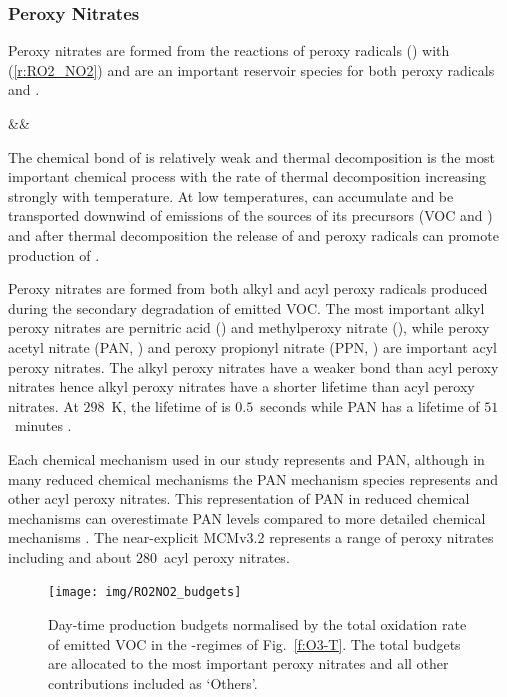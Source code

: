 \subsubsection{Peroxy Nitrates} \label{sss:ro2no2}
Peroxy nitrates are formed from the reactions of peroxy radicals () with  (\ref{r:RO2_NO2}) and are an important reservoir species for both peroxy radicals and .
\begin{rxnarray}
    &&  \rightleftharpoons {} \label{r:RO2_NO2}
\end{rxnarray}
The chemical bond of  is relatively weak and thermal decomposition is the most important chemical process with the rate of thermal decomposition increasing strongly with temperature.
At low temperatures,  can accumulate and be transported downwind of emissions of the sources of its precursors (VOC and ) and after thermal decomposition the release of  and peroxy radicals can promote production of  \citep{Moxim:1996}.

Peroxy nitrates are formed from both alkyl and acyl peroxy radicals produced during the secondary degradation of emitted VOC.
The most important alkyl peroxy nitrates are pernitric acid () and methylperoxy nitrate (), while peroxy acetyl nitrate (PAN, ) and peroxy propionyl nitrate (PPN, ) are important acyl peroxy nitrates.
The alkyl peroxy nitrates have a weaker  bond than acyl peroxy nitrates hence alkyl peroxy nitrates have a shorter lifetime than acyl peroxy nitrates.
At $298$~K, the lifetime of  is $0.5$~seconds while PAN has a lifetime of $51$~minutes \citep{Orlando:2012}.

Each chemical mechanism used in our study represents  and PAN, although in many reduced chemical mechanisms the PAN mechanism species represents  and other acyl peroxy nitrates.
This representation of PAN in reduced chemical mechanisms can overestimate PAN levels compared to more detailed chemical mechanisms \citep{Luecken:1999}.
The near-explicit MCMv3.2 represents a range of peroxy nitrates including  and about $280$~acyl peroxy nitrates.

\begin{figure}[t]%
    \centering%
    \caption{Day-time  production budgets normalised by the total oxidation rate of emitted VOC in the -regimes of Fig.~\ref{f:O3-T}. The total budgets are allocated to the most important peroxy nitrates and all other contributions included as `Others'.}%
    \label{f:ro2no2_budgets}%
    \texttt{[image: img/RO2NO2\_budgets]}
\end{figure}

